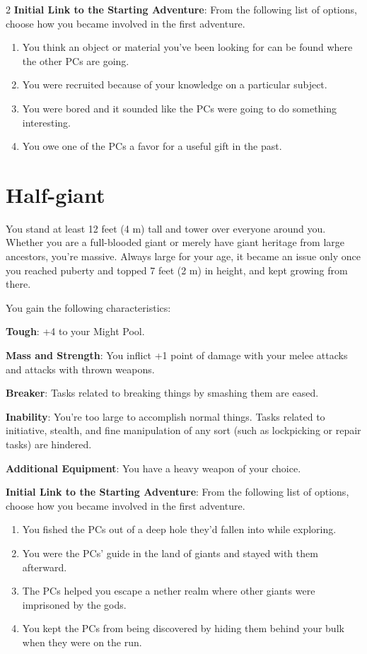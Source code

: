 \begin{multicols}{2}
\textbf{Initial Link to the Starting Adventure}: From the following list of options, choose how you became involved in the first adventure. 

\begin{enumerate} 
\item You think an object or material you’ve been looking for can be found where the other PCs are going. 
\item You were recruited because of your knowledge on a particular subject.
\item You were bored and it sounded like the PCs were going to do something interesting. 
\item You owe one of the PCs a favor for a useful gift in the past.
\end{enumerate}

\section{Half-giant}

You stand at least 12 feet (4 m) tall and tower over everyone around you. Whether you are a full-blooded giant or merely have giant heritage from large ancestors, you’re massive. Always large for your age, it became an issue only once you reached puberty and topped 7 feet (2 m) in height, and kept growing from there.

You gain the following characteristics: 

\textbf{Tough}: +4 to your Might Pool.

\textbf{Mass and Strength}: You inflict +1 point of damage with your melee attacks and attacks with thrown weapons.

\textbf{Breaker}: Tasks related to breaking things by smashing them are eased.

\textbf{Inability}: You’re too large to accomplish normal things. Tasks related to initiative, stealth, and fine manipulation of any sort (such as lockpicking or repair tasks) are hindered.

\textbf{Additional Equipment}: You have a heavy weapon of your choice.

\textbf{Initial Link to the Starting Adventure}: From the following list of options, choose how you became involved in the first adventure.

\begin{enumerate} 
\item You fished the PCs out of a deep hole they’d fallen into while exploring.
\item You were the PCs’ guide in the land of giants and stayed with them afterward.
\item The PCs helped you escape a nether realm where other giants were imprisoned by the gods.
\item You kept the PCs from being discovered by hiding them behind your bulk when they were on the run.
\end{enumerate}


\end{multicols}
